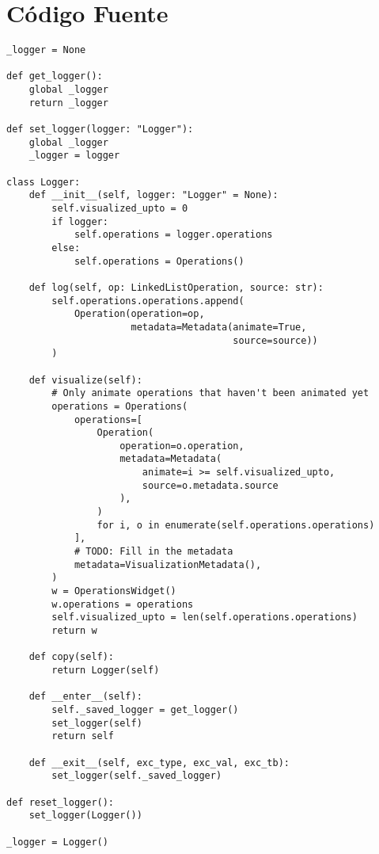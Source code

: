 \chapter{Código Fuente}

\begin{verbatim}
_logger = None

def get_logger():
    global _logger
    return _logger

def set_logger(logger: "Logger"):
    global _logger
    _logger = logger

class Logger:
    def __init__(self, logger: "Logger" = None):
        self.visualized_upto = 0
        if logger:
            self.operations = logger.operations
        else:
            self.operations = Operations()

    def log(self, op: LinkedListOperation, source: str):
        self.operations.operations.append(
            Operation(operation=op,
                      metadata=Metadata(animate=True,
                                        source=source))
        )

    def visualize(self):
        # Only animate operations that haven't been animated yet
        operations = Operations(
            operations=[
                Operation(
                    operation=o.operation,
                    metadata=Metadata(
                        animate=i >= self.visualized_upto,
                        source=o.metadata.source
                    ),
                )
                for i, o in enumerate(self.operations.operations)
            ],
            # TODO: Fill in the metadata
            metadata=VisualizationMetadata(),
        )
        w = OperationsWidget()
        w.operations = operations
        self.visualized_upto = len(self.operations.operations)
        return w

    def copy(self):
        return Logger(self)

    def __enter__(self):
        self._saved_logger = get_logger()
        set_logger(self)
        return self

    def __exit__(self, exc_type, exc_val, exc_tb):
        set_logger(self._saved_logger)

def reset_logger():
    set_logger(Logger())

_logger = Logger()
\end{verbatim}
